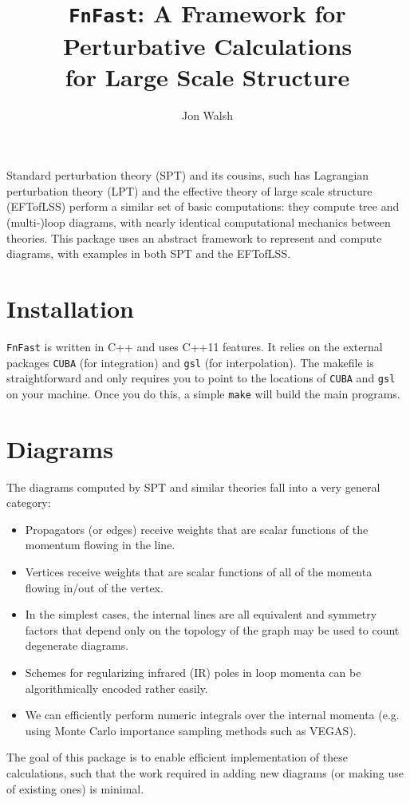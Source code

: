 \documentclass[12pt]{article}
\newcommand{\fnfast}{\texttt{FnFast}\xspace}
\begin{document}
\title{\fnfast: A Framework for Perturbative Calculations \\ for Large Scale Structure}
\author{Jon Walsh}

\maketitle

Standard perturbation theory (SPT) and its cousins, such has Lagrangian perturbation theory (LPT) and the effective theory of large scale structure (EFTofLSS) perform a similar set of basic computations: they compute tree and (multi-)loop diagrams, with nearly identical computational mechanics between theories.  This package uses an abstract framework to represent and compute diagrams, with examples in both SPT and the EFTofLSS.

\section{Installation}

\fnfast is written in C++ and uses C++11 features.  It relies on the external packages \texttt{CUBA} (for integration) and \texttt{gsl} (for interpolation).  The makefile is straightforward and only requires you to point to the locations of \texttt{CUBA} and \texttt{gsl} on your machine.  Once you do this, a simple \texttt{make} will build the main programs.

\section{Diagrams}

The diagrams computed by SPT and similar theories fall into a very general category:
\begin{itemize}
\item Propagators (or edges) receive weights that are scalar functions of the momentum flowing in the line.
\item Vertices receive weights that are scalar functions of all of the momenta flowing in/out of the vertex.
\item In the simplest cases, the internal lines are all equivalent and symmetry factors that depend only on the topology of the graph may be used to count degenerate diagrams.
\item Schemes for regularizing infrared (IR) poles in loop momenta can be algorithmically encoded rather easily.
\item We can efficiently perform numeric integrals over the internal momenta (e.g. using Monte Carlo importance sampling methods such as VEGAS).
\end{itemize}
The goal of this package is to enable efficient implementation of these calculations, such that the work required in adding new diagrams (or making use of existing ones) is minimal.
\end{document}

